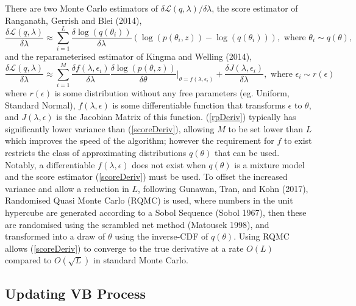 \documentclass[12pt,a4paper]{article}\usepackage[]{graphicx}\usepackage[]{color}
\begin{document}
There are two Monte Carlo estimators of $\delta\mathcal{L}(q, \lambda) / \delta \lambda$, the score estimator of Ranganath, Gerrish and Blei (2014), 
\begin{equation}
\label{scoreDeriv}
\frac{\delta\mathcal{L}(q, \lambda)}{\delta \lambda} \approx \sum_{i = 1}^L \frac{\delta \log(q(\theta_i))}{\delta \lambda} \left(\log(p(\theta_i, z)) - \log(q(\theta_i)) \right), \mbox{ where } \theta_i \sim q(\theta),
\end{equation}
and the reparameterised estimator of Kingma and Welling (2014),
\begin{equation}
\label{rpDeriv}
\frac{\delta\mathcal{L}(q, \lambda)}{\delta \lambda} \approx \sum_{i = 1}^M \frac{\delta f(\lambda, \epsilon_i)}{\delta \lambda} \frac{\delta \log(p(\theta, z))}{\delta \theta} \bigg\rvert_{\theta = f(\lambda, \epsilon_i)} + \frac{\delta J(\lambda, \epsilon_i)}{\delta \lambda}, \mbox{ where } \epsilon_i \sim r(\epsilon)
\end{equation}
where $r(\epsilon)$ is some distribution without any free parameters (eg. Uniform, Standard Normal), $f(\lambda, \epsilon)$ is some differentiable function that transforms $\epsilon$ to $\theta$, and $J(\lambda, \epsilon)$ is the Jacobian Matrix of this function. (\ref{rpDeriv}) typically has significantly lower variance than (\ref{scoreDeriv}), allowing $M$ to be set lower than $L$ which improves the speed of the algorithm; however the requirement for $f$ to exist restricts the class of approximating distributions $q(\theta)$ that can be used.
Notably, a differentiable $f(\lambda, \epsilon)$ does not exist when $q(\theta)$ is a mixture model and the score estimator (\ref{scoreDeriv}) must be used. To offset the increased variance and allow a reduction in $L$, following Gunawan, Tran, and Kohn (2017), Randomised Quasi Monte Carlo (RQMC) is used, where numbers in the unit hypercube are generated according to a Sobol Sequence (Sobol 1967), then these are randomised using the scrambled net method (Matousek 1998), and transformed into a draw of $\theta$ using the inverse-CDF of $q(\theta)$. Using RQMC allows (\ref{scoreDeriv}) to converge to the true derivative at a rate $O(L)$ compared to $O(\sqrt{L})$ in standard Monte Carlo. 

\subsection{Updating VB Process}
\end{document}
